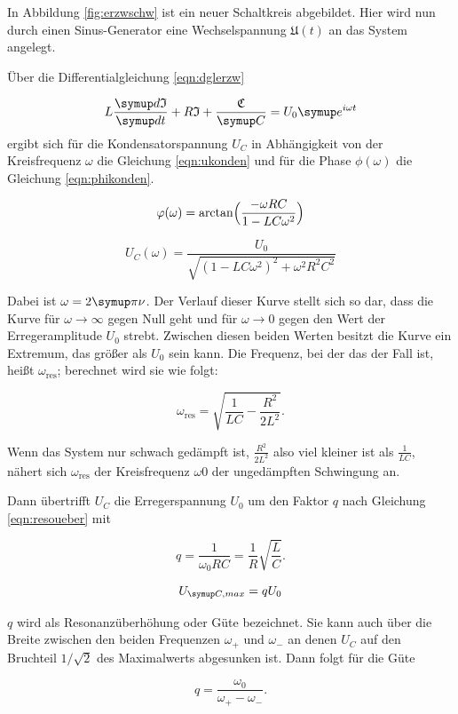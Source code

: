 In Abbildung \ref{fig:erzwschw} ist ein neuer Schaltkreis abgebildet. Hier
wird nun durch einen Sinus-Generator eine Wechselspannung  $\mathfrak{U}(t)$
an das System angelegt.

Über die Differentialgleichung \eqref{eqn:dglerzw}

\begin{equation}
  L\frac{\g{d}\mathfrak{I}}{\g{dt}} + R\mathfrak{I} + \frac{\mathfrak{C}}{\g{C}}
   = U_{\text{0}}\g{e}^{i\omega t}
  \label{eqn:dglerzw}
\end{equation}
ergibt sich für die Kondensatorspannung $U_C$ in Abhängigkeit von der
Kreisfrequenz $\omega$ die Gleichung \eqref{eqn:ukonden} und für die Phase
$\phi(\omega)$ die Gleichung \eqref{eqn:phikonden}.

\begin{equation}
  \varphi(\omega) = \arctan \Bigl(\frac{-\omega R C}{1-LC \omega^2}\Bigr)
  \label{eqn:phikonden}
\end{equation}

\begin{equation}
  U_C(\omega) = \frac{U_\text{0}}{\sqrt{(1 - LC\omega^2)^2 + \omega^2
  R^2C^2}}
  \label{eqn:ukonden}
\end{equation}

Dabei ist $\omega = 2 \g{\pi} \nu$. Der Verlauf dieser Kurve stellt sich
so dar, dass die Kurve für $\omega \to \infty$ gegen Null geht und für
$\omega \to 0$ gegen den Wert der Erregeramplitude $U_0$ strebt.
Zwischen diesen beiden Werten besitzt die Kurve ein Extremum, das
größer als $U_0$ sein kann. Die Frequenz, bei der das der Fall ist,
heißt $\omega_{\text{res}}$; berechnet wird sie wie folgt:

\begin{equation}
  \omega_{\text{res}} = \sqrt{\frac{1}{LC} - \frac{R^2}{2L^2}}.
\end{equation}

Wenn das System nur schwach gedämpft ist, $\frac{R^2}{2L^2}$ also viel
kleiner ist als $\frac{1}{LC}$, nähert sich $\omega_{\text{res}}$ der
Kreisfrequenz $\omega{\text{0}}$ der ungedämpften Schwingung an.

Dann übertrifft $U_C$ die Erregerspannung $U_0$ um den Faktor $q$ nach
Gleichung \eqref{eqn:resoueber} mit

\begin{equation}
  q = \frac{1}{\omega_0RC} = \frac{1}{R}\sqrt{\frac{L}{C}}.
\end{equation}

\begin{equation}
  U_{\g{C,max}} = q U_{\text{0}}
  \label{eqn:resoueber}
\end{equation}

$q$ wird als Resonanzüberhöhung oder Güte bezeichnet.
Sie kann auch über die Breite zwischen den beiden Frequenzen $\omega_+$
und $\omega_-$ an denen $U_C$ auf den Bruchteil $1/\sqrt{2}$ des
Maximalwerts abgesunken ist. Dann folgt für die Güte

\begin{equation}
  q = \frac{\omega_{\text{0}}}{\omega_+ - \omega_-}.
\end{equation}
